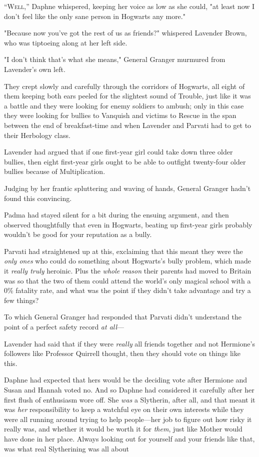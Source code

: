 
\lettrine{“W}{ell,''} Daphne
whispered, keeping her voice as low as she could, "at least now I don't feel
like the only sane person in Hogwarts any more."

"Because now you've got the rest of us as friends?" whispered Lavender Brown,
who was tiptoeing along at her left side.

"I don't think that's what she means," General Granger murmured from Lavender's
own left.

They crept slowly and carefully through the corridors of Hogwarts, all eight of
them keeping both ears peeled for the slightest sound of Trouble, just like it
was a battle and they were looking for enemy soldiers to ambush; only in this
case they were looking for bullies to Vanquish and victims to Rescue in the
span between the end of breakfast-time and when Lavender and Parvati had to get
to their Herbology class.

Lavender had argued that if one first-year girl could take down three older
bullies, then eight first-year girls ought to be able to outfight twenty-four
older bullies because of Multiplication.

Judging by her frantic spluttering and waving of hands, General Granger hadn't
found this convincing.

Padma had stayed silent for a bit during the ensuing argument, and then
observed thoughtfully that even in Hogwarts, beating up first-year girls
probably wouldn't be good for your reputation as a bully.

Parvati had straightened up at this, exclaiming that this meant they were the
\emph{only ones} who could do something about Hogwarts's bully problem, which
made it \emph{really truly} heroinic. Plus the \emph{whole reason} their
parents had moved to Britain was so that the two of them could attend the
world's only magical school with a 0\% fatality rate, and what was the point if
they didn't take advantage and try a few things?

To which General Granger had responded that Parvati didn't understand the point
of a perfect safety record \emph{at all}---

Lavender had said that if they were \emph{really} all friends together and not
Hermione's followers like Professor Quirrell thought, then they should vote on
things like this.

Daphne had expected that hers would be the deciding vote after Hermione and
Susan and Hannah voted no. And so Daphne had considered it carefully after her
first flush of enthusiasm wore off. She \emph{was} a Slytherin, after all, and
that meant it was \emph{her} responsibility to keep a watchful eye on their own
interests while they were all running around trying to help people---her job to
figure out how risky it really was, and whether it would be worth it for
\emph{them}, just like Mother would have done in her place. Always looking out
for yourself and your friends like that, was what real Slytherining was all
about{\el}

